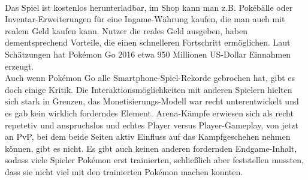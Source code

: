 \documentclass[extern,palatino]{cgBA}
\begin{document}
	\\Das Spiel ist kostenlos herunterladbar, im Shop kann man z.B. Pokébälle oder Inventar-Erweiterungen für eine Ingame-Währung kaufen, die man auch mit realem Geld kaufen kann. Nutzer die reales Geld ausgeben, haben dementsprechend Vorteile, die einen schnelleren Fortschritt ermöglichen. Laut Schätzungen hat Pokémon Go 2016 etwa 950 Millionen US-Dollar Einnahmen erzeugt.%
	\\Auch wenn Pokémon Go alle Smartphone-Spiel-Rekorde gebrochen hat, gibt es doch einige Kritik. Die Interaktionsmöglichkeiten mit anderen Spielern hielten sich stark in Grenzen, das Monetisierungs-Modell war recht unterentwickelt und es gab kein wirklich forderndes Element. Arena-Kämpfe erwiesen sich als recht repetetiv und anspruchslos und echtes Player versus Player-Gameplay, von jetzt an PvP, bei dem beide Seiten aktiv Einfluss auf das Kampfgeschehen nehmen können, gibt es nicht. Es gibt auch keinen anderen fordernden Endgame-Inhalt, sodass viele Spieler Pokémon erst trainierten, schließlich aber feststellen mussten, dass sie nicht viel mit den trainierten Pokémon machen konnten. %
	\newpage
\end{document}
